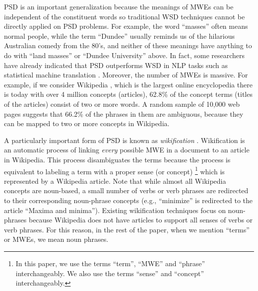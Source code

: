 PSD is an important generalization because
the meanings of MWEs can be independent of the constituent words so traditional
WSD techniques cannot be directly applied on PSD problems. For example,
the word ``masses''  often means normal people, while the term ``Dundee''
usually reminds us of the hilarious Australian comedy from the 80's, and
neither of these meanings have anything to do with ``land masses''
or ``Dundee University'' above.
In fact, some researchers have already indicated that
PSD outperforms WSD in NLP tasks such as statistical
machine translation \cite{carpuat2007phrase}.
Moreover, the number of MWEs is massive. For example, if we consider
Wikipedia \cite{wikipedia},
which is the largest online encyclopedia there is today with
over 4 million concepts (articles), 62.8\% of the concept terms (titles
of the articles) consist of two or more words. %
A random sample of 10,000 web pages suggests that 66.2\%
of the phrases in them are ambiguous, because they can be mapped to
two or more concepts in Wikipedia.


A particularly important form of PSD is known as
{\em wikification} \cite{MihalceaC07}. Wikification is an automatic process
of linking {\em every} possible MWE
in a document to an article in Wikipedia. This process
disambiguates the terms because the process is equivalent to labeling
a term with a proper sense (or concept) \footnote{In this paper,
we use the terms ``term'', ``MWE'' and ``phrase'' interchangeably.
We also use the terms ``sense'' and ``concept'' interchangeably.}
which is represented by a Wikipedia article.
Note that while almost all Wikipedia
concepts are noun-based, a small number of verbs or verb phrases are redirected to
their corresponding noun-phrase concepts (e.g., ``minimize'' is redirected to
the article ``Maxima and minima'').
Existing wikification techniques focus on noun-phrases because Wikipedia
does not have articles to support all senses of verbs or verb phrases.
For this reason, in the rest of the paper, when we mention ``terms'' or
MWEs, we mean noun phrases.


